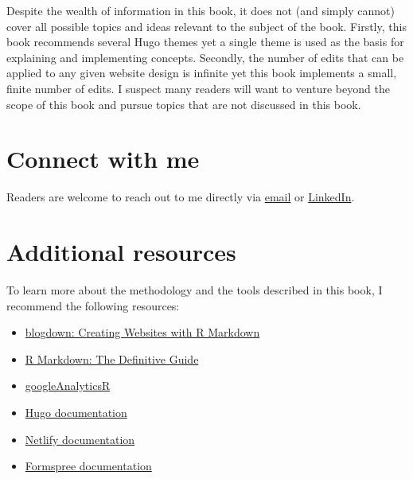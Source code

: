 \documentclass[
]{book}
\begin{document}
Despite the wealth of information in this book, it does not (and simply cannot) cover all possible topics and ideas relevant to the subject of the book. Firstly, this book recommends several Hugo themes yet a single theme is used as the basis for explaining and implementing concepts. Secondly, the number of edits that can be applied to any given website design is infinite yet this book implements a small, finite number of edits. I suspect many readers will want to venture beyond the scope of this book and pursue topics that are not discussed in this book.

\hypertarget{connect-with-me}{%
\section{Connect with me}\label{connect-with-me}}

Readers are welcome to reach out to me directly via \href{mailto:dmorris10667@gmail.com}{email} or \href{https://www.linkedin.com/in/drmorris87/}{LinkedIn}.

\hypertarget{additional-resources}{%
\section{Additional resources}\label{additional-resources}}

To learn more about the methodology and the tools described in this book, I recommend the following resources:

\begin{itemize}
\item
  \href{https://bookdown.org/yihui/blogdown/}{blogdown: Creating Websites with R Markdown}
\item
  \href{https://bookdown.org/yihui/rmarkdown/}{R Markdown: The Definitive Guide}
\item
  \href{https://code.markedmondson.me/googleAnalyticsR/}{googleAnalyticsR}
\item
  \href{https://gohugo.io/documentation/}{Hugo documentation}
\item
  \href{https://docs.netlify.com/}{Netlify documentation}
\item
  \href{https://formspree.io/formbutton/docs}{Formspree documentation}
\end{itemize}

  
\end{document}
